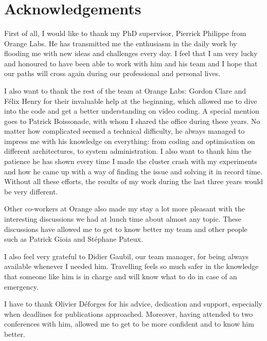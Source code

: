 \documentclass[11pt,a4paper,openright,twoside]{book}
\title{\Huge\bf\mytitle}
\author{\myauthor}
\def\useINSAcover{0} %
\numberwithin{equation}{section} %
\numberwithin{figure}{section} %
\numberwithin{table}{section} %
\begin{document}
\frontmatter
\ifthenelse{\useINSAcover = 1}
{
	
	\cleardoublepage
	
}{\maketitle}

\chapter*{Acknowledgements}
\label{cha:acknowledgements}

First of all, I would like to thank my PhD supervisor, Pierrick Philippe from
Orange Labs.
He has transmitted me the enthusiasm in the daily work by flooding me with new
ideas and challenges every day.
I feel that I am very lucky and honoured to have been able to work with him
and his team and I hope that our paths will cross again during our
professional and personal lives.

I also want to thank the rest of the team at Orange Labs: Gordon Clare and
Félix Henry for their invaluable help at the beginning, which allowed me to
dive into the code and get a better understanding on video coding.
A special mention goes to Patrick Boissonade, with whom I shared the office
during these years.
No matter how complicated seemed a technical difficulty, he always managed to
impress me with his knowledge on everything: from coding and optimisation on
different architectures, to system administration.
I also want to thank him the patience he has shown every time I made the
cluster crash with my experiments and how he came up with a way of finding the
issue and solving it in record time.
Without all these efforts, the results of my work during the last three years
would be very different.

Other co-workers at Orange also made my stay a lot more pleasant with the
interesting discussions we had at lunch time about almost any topic.
These discussions have allowed me to get to know better my team and other
people such as Patrick Gioia and Stéphane Pateux.

I also feel very grateful to Didier Gaubil, our team manager, for being always
available whenever I needed him.
Travelling feels so much safer in the knowledge that someone like him is in
charge and will know what to do in case of an emergency.

I have to thank Olivier Déforges for his advice, dedication and support,
especially when deadlines for publications approached.
Moreover, having attended to two conferences with him, allowed me to get to
be more confident and to know him better.
\end{document}
